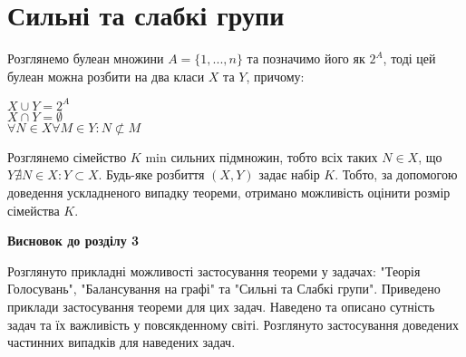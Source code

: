 \section{Сильні та слабкі групи}

Розглянемо  булеан множини $A = \{1,...,n\}$ та позначимо його як $2^A$, тоді цей булеан можна розбити на два класи $X$ та $Y$, причому:

\begin{center}
$X \cup Y = 2^A$
\\
$X \cap Y = \emptyset $
\\
$\forall N \in X \forall M \in Y: N \nsubset M  $     
\end{center}

Розглянемо сімейство $K$ min сильних підмножин, тобто всіх таких $N ∈ X$, що $ Y \nexists N \in X : Y ⊂ X$. Будь-яке розбиття $(X,Y)$ задає набір $K$. Тобто, за допомогою доведення ускладненого випадку теореми, отримано можливість оцінити розмір сімейства $K$.

\textbf{Висновок до розділу 3}

	Розглянуто прикладні можливості застосування теореми у задачах: "Теорія Голосувань", "Балансування на графі" та "Сильні та Слабкі групи". Приведено приклади застосування теореми для цих задач. Наведено та описано сутність задач та їх важливість у повсякденному світі. Розглянуто застосування доведених частинних випадків для наведених задач.
